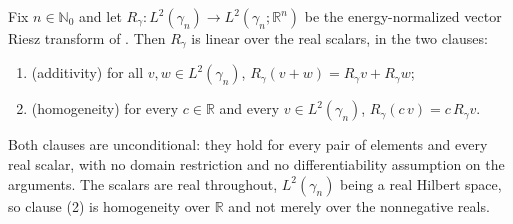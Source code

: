 \begin{lemma}
Fix $n \in \mathbb{N}_0$ and let $R_\gamma : L^2(\gamma_n) \to
L^2(\gamma_n;\mathbb{R}^n)$ be the energy-normalized vector Riesz transform of
.  Then $R_\gamma$ is linear over the real scalars, in
the two clauses:
\begin{enumerate}
  \item (additivity) for all $v, w \in L^2(\gamma_n)$,
    $R_\gamma(v + w) = R_\gamma v + R_\gamma w$;
  \item (homogeneity) for every $c \in \mathbb{R}$ and every
    $v \in L^2(\gamma_n)$, $R_\gamma(c\,v) = c\,R_\gamma v$.
\end{enumerate}
Both clauses are unconditional: they hold for every pair of elements and every
real scalar, with no domain restriction and no differentiability assumption on
the arguments.  The scalars are real throughout, $L^2(\gamma_n)$ being a real
Hilbert space, so clause (2) is homogeneity over $\mathbb{R}$ and not merely
over the nonnegative reals.
\end{lemma}
